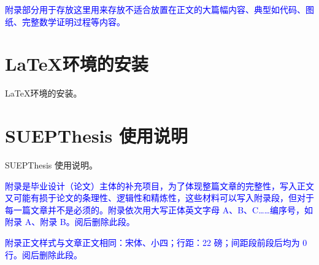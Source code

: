 %
%
%
%
%

\begin{appendices}
    
    \textcolor{blue}{附录部分用于存放这里用来存放不适合放置在正文的大篇幅内容、典型如代码、图纸、完整数学证明过程等内容。}
  
  
    \section{\LaTeX 环境的安装}
    \LaTeX 环境的安装。


  
    \section{SUEPThesis 使用说明}
    SUEPThesis 使用说明。
  
    \textcolor{blue}{附录是毕业设计（论文）主体的补充项目，为了体现整篇文章的完整性，写入正文又可能有损于论文的条理性、逻辑性和精炼性，这些材料可以写入附录段，但对于每一篇文章并不是必须的。附录依次用大写正体英文字母 A、B、C……编序号，如附录 A、附录 B。阅后删除此段。}
  
    \textcolor{blue}{附录正文样式与文章正文相同：宋体、小四；行距：22 磅；间距段前段后均为 0 行。阅后删除此段。}
  
\end{appendices}